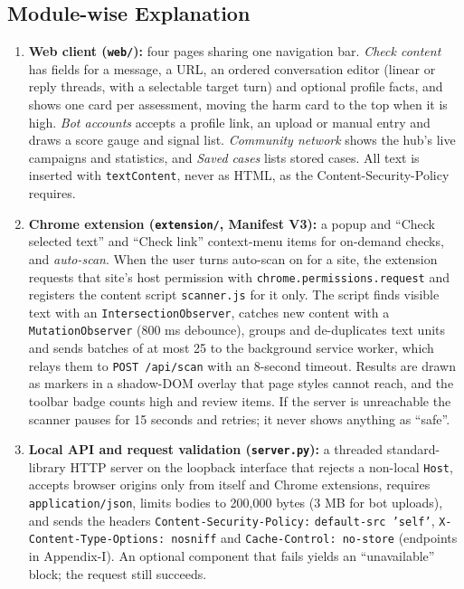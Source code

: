 \subsection{Module-wise Explanation}
\begin{enumerate}[label=\textbf{M\arabic*}, leftmargin=1.2cm]
\item \textbf{Web client (\texttt{web/}):} four pages sharing one navigation bar. \emph{Check content} has fields for a message, a URL, an ordered conversation editor (linear or reply threads, with a selectable target turn) and optional profile facts, and shows one card per assessment, moving the harm card to the top when it is high. \emph{Bot accounts} accepts a profile link, an upload or manual entry and draws a score gauge and signal list. \emph{Community network} shows the hub's live campaigns and statistics, and \emph{Saved cases} lists stored cases. All text is inserted with \texttt{textContent}, never as HTML, as the Content-Security-Policy requires.
\item \textbf{Chrome extension (\texttt{extension/}, Manifest V3):} a popup and ``Check selected text'' and ``Check link'' context-menu items for on-demand checks, and \emph{auto-scan}. When the user turns auto-scan on for a site, the extension requests that site's host permission with \texttt{chrome.permissions\allowbreak.request} and registers the content script \texttt{scanner.js} for it only. The script finds visible text with an \texttt{IntersectionObserver}, catches new content with a \texttt{MutationObserver} (800 ms debounce), groups and de-duplicates text units and sends batches of at most 25 to the background service worker, which relays them to \texttt{POST /api/scan} with an 8-second timeout. Results are drawn as markers in a shadow-DOM overlay that page styles cannot reach, and the toolbar badge counts high and review items. If the server is unreachable the scanner pauses for 15 seconds and retries; it never shows anything as ``safe''.
\item \textbf{Local API and request validation (\texttt{server.py}):} a threaded standard-library HTTP server on the loopback interface that rejects a non-local \texttt{Host}, accepts browser origins only from itself and Chrome extensions, requires \texttt{application/json}, limits bodies to 200,000 bytes (3 MB for bot uploads), and sends the headers \texttt{Content-Security-Policy:} \texttt{default-src 'self'}, \texttt{X-Content-Type-\allowbreak Options: nosniff} and \texttt{Cache-Control: no-store} (endpoints in Appendix-I). An optional component that fails yields an ``unavailable'' block; the request still succeeds.

\end{enumerate}
